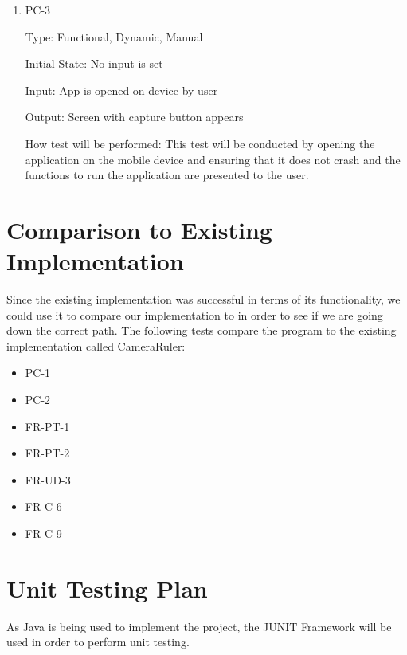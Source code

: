 \documentclass[12pt, titlepage]{article}
\begin{document}
\begin{enumerate}

\item{PC-3\\}

Type: Functional, Dynamic, Manual
					
Initial State: No input is set
					
Input: App is opened on device by user
					
Output: Screen with capture button appears 
					
How test will be performed: This test will be conducted by opening the application on the mobile device and ensuring that it does not crash and the functions to run the application are presented to the user.  

\end{enumerate}

	
\section{Comparison to Existing Implementation}	

Since the existing implementation was successful in terms of its functionality, we could use it to compare our implementation to in order to see if we are going down the correct path. The following tests compare the program to the existing implementation called CameraRuler:

\begin{itemize}
\item{PC-1\\}
\item{PC-2\\}
\item{FR-PT-1\\}
\item{FR-PT-2\\}
\item{FR-UD-3\\}
\item{FR-C-6\\}
\item{FR-C-9\\}

\end{itemize}
				
\section{Unit Testing Plan}

As Java is being used to implement the project, the JUNIT Framework will be used in order to perform unit testing.
		
\end{document}

